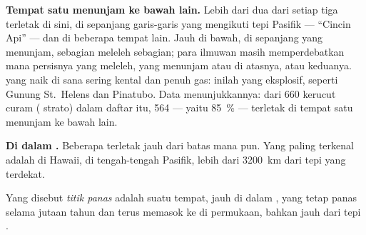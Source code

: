\textbf{Tempat satu  menunjam ke bawah  lain.} Lebih dari
dua dari setiap tiga  terletak di sini, di sepanjang garis-garis
yang mengikuti tepi  Pasifik --- ``Cincin Api'' --- dan di beberapa
tempat lain. Jauh di bawah, di sepanjang  yang menunjam, sebagian
 meleleh sebagian; para ilmuwan masih memperdebatkan  mana
persisnya yang meleleh,  yang menunjam atau  di atasnya, atau
keduanya.  yang naik di sana sering kental dan penuh gas: inilah
 yang eksplosif, seperti Gunung St.~Helens dan Pinatubo.
Data menunjukkannya: dari 660 kerucut curam ( strato) dalam
daftar itu, 564 --- yaitu 85~\% --- terletak di tempat satu 
menunjam ke bawah  lain.

\textbf{Di dalam .} Beberapa  terletak jauh dari batas mana
pun. Yang paling terkenal adalah  di Hawaii, di
tengah-tengah  Pasifik, lebih dari \qty{3200}{km} dari tepi 
yang terdekat.

\begin{definition}\label{def:g7:volcanoes:hotspot}
Yang disebut \emph{titik panas} adalah suatu tempat, jauh
di dalam , yang tetap panas selama jutaan tahun dan terus memasok
 ke  di permukaan, bahkan jauh dari tepi .
\end{definition}

